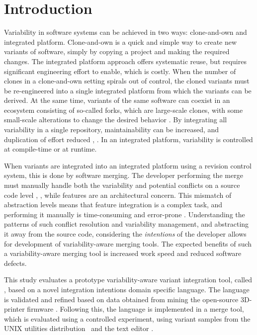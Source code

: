 \chapter{Introduction}
Variability in software systems can be achieved in two ways: clone-and-own and integrated platform. Clone-and-own is a quick and simple way to create new variants of software, simply by copying a project and making the required changes. The integrated platform approach offers systematic reuse, but requires significant engineering effort to enable, which is costly. When the number of clones in a clone-and-own setting spirals out of control, the cloned variants must be re-engineered into a single integrated platform from which the variants can be derived. At the same time, variants of the same software can coexist in an ecosystem consisting of so-called forks, which are large-scale clones, with some small-scale alterations to change the desired behavior \cite{stanciulescu2015}. By integrating all variability in a single repository, maintainability can be increased, and duplication of effort reduced \cite{schmorleiz2016similarity}, \cite{stanciulescu2015}. In an integrated platform, variability is controlled at compile-time or at runtime.

When variants are integrated into an integrated platform using a revision control system, this is done by software merging. The developer performing the merge must manually handle both the variability and potential conflicts on a source code level \cite{mens2002}, \cite{apel2011}, while features are an architectural concern. This mismatch of abstraction levels means that feature integration is a complex task, and performing it manually is time-consuming and error-prone \cite{melo2016latin}. Understanding the patterns of such conflict resolution and variability management, and abstracting it away from the source code, considering the \textit{intentions} of the developer allows for development of variability-aware merging tools. The expected benefits of such a variability-aware merging tool is increased work speed and reduced software defects.

This study evaluates a prototype variability-aware variant integration tool, called \tooln, based on a novel integration intentions domain specific language.
The language is validated and refined based on data obtained from mining the open-source 3D-printer firmware \marlin. Following this, the language is implemented in a merge tool, which is evaluated using a controlled experiment, using variant samples from the UNIX utilities distribution \busybox~and the text editor \vim.

